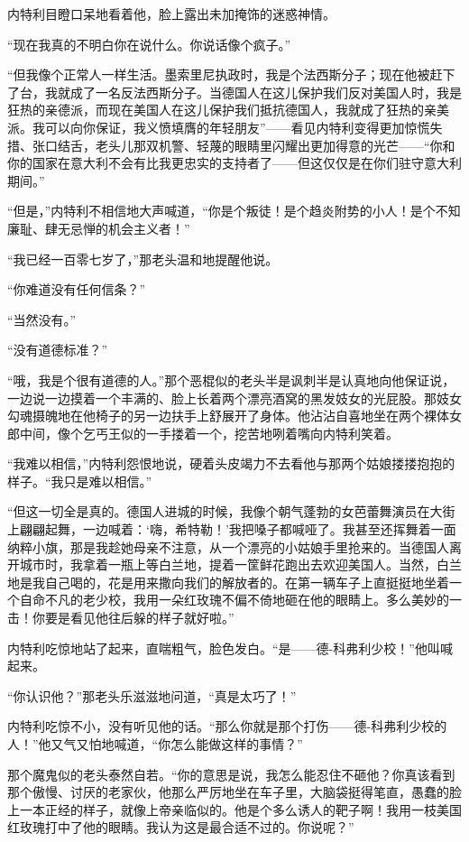     内特利目瞪口呆地看着他，脸上露出未加掩饰的迷惑神情。

    “现在我真的不明白你在说什么。你说话像个疯子。”

    “但我像个正常人一样生活。墨索里尼执政时，我是个法西斯分子；现在他被赶下了台，我就成了一名反法西斯分子。当德国人在这儿保护我们反对美国人时，我是狂热的亲德派，而现在美国人在这儿保护我们抵抗德国人，我就成了狂热的亲美派。我可以向你保证，我义愤填膺的年轻朋友”——看见内特利变得更加惊慌失措、张口结舌，老头儿那双机警、轻蔑的眼睛里闪耀出更加得意的光芒——“你和你的国家在意大利不会有比我更忠实的支持者了——但这仅仅是在你们驻守意大利期间。”

    “但是，”内特利不相信地大声喊道，“你是个叛徒！是个趋炎附势的小人！是个不知廉耻、肆无忌惮的机会主义者！”

    “我已经一百零七岁了，”那老头温和地提醒他说。

    “你难道没有任何信条？”

    “当然没有。”

    “没有道德标准？”

    “哦，我是个很有道德的人。”那个恶棍似的老头半是讽刺半是认真地向他保证说，一边说一边摸着一个丰满的、脸上长着两个漂亮酒窝的黑发妓女的光屁股。那妓女勾魂摄魄地在他椅子的另一边扶手上舒展开了身体。他沾沾自喜地坐在两个裸体女郎中间，像个乞丐王似的一手搂着一个，挖苦地咧着嘴向内特利笑着。

    “我难以相信，”内特利怨恨地说，硬着头皮竭力不去看他与那两个姑娘搂搂抱抱的样子。“我只是难以相信。”

    “但这一切全是真的。德国人进城的时候，我像个朝气蓬勃的女芭蕾舞演员在大街上翩翩起舞，一边喊着：‘嗨，希特勒！’我把嗓子都喊哑了。我甚至还挥舞着一面纳粹小旗，那是我趁她母亲不注意，从一个漂亮的小姑娘手里抢来的。当德国人离开城市时，我拿着一瓶上等白兰地，提着一筐鲜花跑出去欢迎美国人。当然，白兰地是我自己喝的，花是用来撒向我们的解放者的。在第一辆车子上直挺挺地坐着一个自命不凡的老少校，我用一朵红玫瑰不偏不倚地砸在他的眼睛上。多么美妙的一击！你要是看见他往后躲的样子就好啦。”

    内特利吃惊地站了起来，直喘粗气，脸色发白。“是——德-科弗利少校！”他叫喊起来。

    “你认识他？”那老头乐滋滋地问道，“真是太巧了！”

    内特利吃惊不小，没有听见他的话。“那么你就是那个打伤——德-科弗利少校的人！”他又气又怕地喊道，“你怎么能做这样的事情？”

    那个魔鬼似的老头泰然自若。“你的意思是说，我怎么能忍住不砸他？你真该看到那个傲慢、讨厌的老家伙，他那么严厉地坐在车子里，大脑袋挺得笔直，愚蠢的脸上一本正经的样子，就像上帝亲临似的。他是个多么诱人的靶子啊！我用一枝美国红玫瑰打中了他的眼睛。我认为这是最合适不过的。你说呢？”
 


